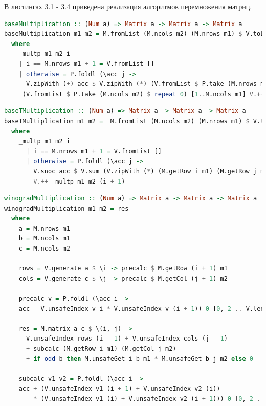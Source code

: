\documentclass[12pt]{report}
\begin{document}
В листингах 3.1 - 3.4 приведена реализация алгоритмов перемножения матриц.

\begin{lstlisting}[label=some-code,caption=Функция умножения матриц обычным способом, language=Haskell]
baseMultiplication :: (Num a) => Matrix a -> Matrix a -> Matrix a
baseMultiplication m1 m2 = M.fromList (M.ncols m2) (M.nrows m1) $ V.toList $ _multp m1 m2 1
  where
    _multp m1 m2 i
    | i == M.nrows m1 + 1 = V.fromList []
    | otherwise = P.foldl (\acc j ->
      V.zipWith (+) acc $ V.zipWith (*) (V.fromList $ P.take (M.nrows m1) $ repeat (M.getElem i j m1)) (M.getRow j m2))
     (V.fromList $ P.take (M.ncols m2) $ repeat 0) [1..M.ncols m1] V.++ _multp m1 m2 (i + 1)
\end{lstlisting}

\begin{lstlisting}[label=some-code,caption=Функция умножения матриц с транспонированием,language=Haskell]
baseTMultiplication :: (Num a) => Matrix a -> Matrix a -> Matrix a
baseTMultiplication m1 m2 =  M.fromList (M.ncols m2) (M.nrows m1) $ V.toList $ _multp m1 (M.transpose m2) 1
  where
    _multp m1 m2 i
      | i == M.nrows m1 + 1 = V.fromList []
      | otherwise = P.foldl (\acc j ->
        V.snoc acc $ V.sum (V.zipWith (*) (M.getRow i m1) (M.getRow j m2))) (V.fromList []) [1..M.nrows m2]
        V.++ _multp m1 m2 (i + 1)
\end{lstlisting}

\begin{lstlisting}[label=some-code,caption=Функция умножения матриц по Винограду,language=Haskell]
winogradMultiplication :: (Num a) => Matrix a -> Matrix a -> Matrix a
winogradMultiplication m1 m2 = res
  where
    a = M.nrows m1
    b = M.ncols m1
    c = M.ncols m2

    rows = V.generate a $ \i -> precalc $ M.getRow (i + 1) m1
    cols = V.generate c $ \j -> precalc $ M.getCol (j + 1) m2

    precalc v = P.foldl (\acc i ->
    acc - V.unsafeIndex v i * V.unsafeIndex v (i + 1)) 0 [0, 2 .. V.length v - 2]
	
    res = M.matrix a c $ \(i, j) ->
      V.unsafeIndex rows (i - 1) + V.unsafeIndex cols (j - 1)
      + subcalc (M.getRow i m1) (M.getCol j m2)
      + if odd b then M.unsafeGet i b m1 * M.unsafeGet b j m2 else 0
	
    subcalc v1 v2 = P.foldl (\acc i ->
    acc + (V.unsafeIndex v1 (i + 1) + V.unsafeIndex v2 (i))
        * (V.unsafeIndex v1 (i) + V.unsafeIndex v2 (i + 1))) 0 [0, 2 .. V.length v1 - 2]
\end{lstlisting}
\end{document}
